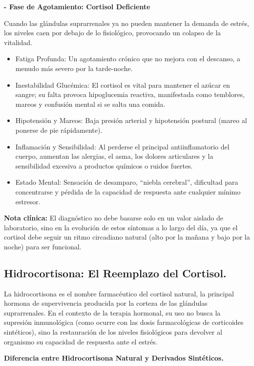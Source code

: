 \documentclass[
  spanish,
]{article}
\begin{document}
\textbf{- Fase de Agotamiento: Cortisol Deficiente}

Cuando las glándulas suprarrenales ya no pueden mantener la demanda de estrés, los niveles caen por debajo de lo fisiológico, provocando un colapso de la vitalidad.

\begin{itemize}
\item
  Fatiga Profunda: Un agotamiento crónico que no mejora con el descanso, a menudo más severo por la tarde-noche.
\item
  Inestabilidad Glucémica: El cortisol es vital para mantener el azúcar en sangre; su falta provoca hipoglucemia reactiva, manifestada como temblores, mareos y confusión mental si se salta una comida.
\item
  Hipotensión y Mareos: Baja presión arterial y hipotensión postural (mareo al ponerse de pie rápidamente).
\item
  Inflamación y Sensibilidad: Al perderse el principal antiinflamatorio del cuerpo, aumentan las alergias, el asma, los dolores articulares y la sensibilidad excesiva a productos químicos o ruidos fuertes.
\item
  Estado Mental: Sensación de desamparo, ``niebla cerebral'', dificultad para concentrarse y pérdida de la capacidad de respuesta ante cualquier mínimo estresor.
\end{itemize}

\textbf{Nota clínica:} El diagnóstico no debe basarse solo en un valor aislado de laboratorio, sino en la evolución de estos síntomas a lo largo del día, ya que el cortisol debe seguir un ritmo circadiano natural (alto por la mañana y bajo por la noche) para ser funcional.

\subsection{Hidrocortisona: El Reemplazo del Cortisol.}\label{hidrocortisona-el-reemplazo-del-cortisol.}

La hidrocortisona es el nombre farmacéutico del cortisol natural, la principal hormona de supervivencia producida por la corteza de las glándulas suprarrenales. En el contexto de la terapia hormonal, su uso no busca la supresión inmunológica (como ocurre con las dosis farmacológicas de corticoides sintéticos), sino la restauración de los niveles fisiológicos para devolver al organismo su capacidad de respuesta ante el estrés.

\textbf{Diferencia entre Hidrocortisona Natural y Derivados Sintéticos.}
\end{document}
